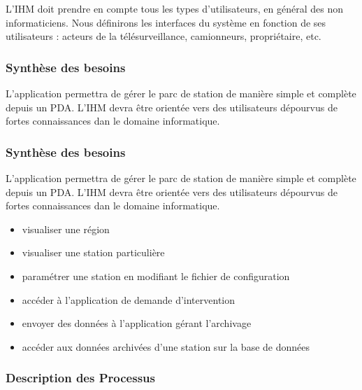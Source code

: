 L'IHM doit prendre en compte tous les types d'utilisateurs, en général des non informaticiens. 
Nous définirons les interfaces du système en fonction de ses utilisateurs : 
acteurs de la télésurveillance, camionneurs, propriétaire, etc.
 



\subsubsection{Synthèse des besoins}
L'application permettra de gérer le parc de station de manière simple et complète depuis un PDA. 
L'IHM devra être orientée vers des utilisateurs dépourvus de fortes connaissances dan le domaine informatique.\\

\subsubsection{Synthèse des besoins}
L'application permettra de gérer le parc de station de manière simple et complète depuis un PDA. L'IHM devra être orientée vers des utilisateurs dépourvus de fortes connaissances dan le domaine informatique.\\


\begin{itemize}
\item   visualiser une région \\
\item	visualiser une station particulière \\
\item	paramétrer une station en modifiant le fichier de configuration \\
\item	accéder à l'application de demande d'intervention \\
\item	envoyer des données à l'application gérant l'archivage\\ 
\item	accéder aux données archivées d'une station sur la base de données\\
\end{itemize}


\subsubsection{Description des Processus}

